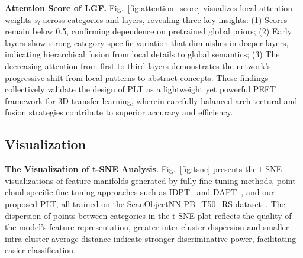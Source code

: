 %

\textbf{Attention Score of LGF.} Fig.~\ref{fig:attention_score} visualizes local attention weights $s_l$ across categories and layers, revealing three key insights: (1) Scores remain below 0.5, confirming dependence on pretrained global priors; (2) Early layers show strong category-specific variation that diminishes in deeper layers, indicating hierarchical fusion from local details to global semantics; (3) The decreasing attention from first to third layers demonstrates the network's progressive shift from local patterns to abstract concepts.
These findings collectively validate the design of PLT as a lightweight yet powerful PEFT framework for 3D transfer learning, wherein carefully balanced architectural and fusion strategies contribute to superior accuracy and efficiency.



\subsection{Visualization}

\textbf{The Visualization of t-SNE Analysis}. Fig.~\ref{fig:tsne} presents the t-SNE~\cite{van2008visualizing} visualizations of feature manifolds generated by fully fine-tuning methods, point-cloud-specific fine-tuning approaches such as IDPT~\cite{zha2023instance} and DAPT~\cite{zhou2024dynamic}, and our proposed PLT, all trained on the ScanObjectNN PB\_T50\_RS dataset~\cite{uy2019revisiting}. The dispersion of points between categories in the t-SNE plot reflects the quality of the model's feature representation, greater inter-cluster dispersion and smaller intra-cluster average distance indicate stronger discriminative power, facilitating easier classification.

